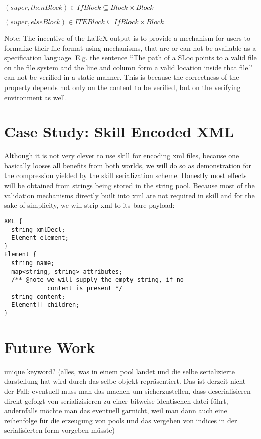 \documentclass[a4paper,10pt]{article}
\begin{document}
$(super, thenBlock) \in IfBlock \subseteq Block \times Block$

$(super, elseBlock) \in ITEBlock \subseteq IfBlock \times Block$

Note: The incentive of the \LaTeX-output is to provide a mechanism for users to formalize their file format using mechanisms, that are or can not be available as a specification language. E.g. the sentence ``The path of a SLoc points to a valid file on the file system and the line and column form a valid location inside that file.'' can not be verified in a static manner. This is because the correctness of the property depends not only on the content to be verified, but on the verifying environment as well.

\section{Case Study: Skill Encoded XML}
Although it is not very clever to use skill for encoding xml files, because one basically looses all benefits from both worlds, we will do so as demonstration for the compression yielded by the skill serialization scheme. Honestly most effects will be obtained from strings being stored in the string pool. Because most of the validation mechanisms directly built into xml are not required in skill and for the sake of simplicity, we will strip xml to its bare payload:
\begin{lstlisting}[label=sex,caption=Skill Encoded XML]
XML {
  string xmlDecl;
  Element element;
}
Element {
  string name;
  map<string, string> attributes;
  /** @note we will supply the empty string, if no
            content is present */
  string content;
  Element[] children;
}
\end{lstlisting}


\section{Future Work}
unique keyword? (alles, was in einem pool landet und die selbe serializierte darstellung hat wird durch das selbe objekt repräsentiert. Das ist derzeit nicht der Fall; eventuell muss man das machen um sicherzustellen, dass deserialisieren direkt gefolgt von serializisieren zu einer bitweise identischen datei führt, andernfalls möchte man das eventuell garnicht, weil man dann auch eine reihenfolge für die erzeugung von pools und das vergeben von indices in der serialisierten form vorgeben müsste)
\end{document}
